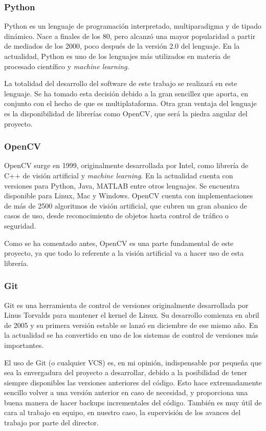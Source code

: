 \subsubsection*{Python}
Python es un lenguaje de programación interpretado, multiparadigma y de tipado dinámico. Nace a finales de los 80, pero alcanzó una mayor popularidad a partir de mediados de los 2000, poco después de la versión 2.0 del lenguaje. En la actualidad, Python es uno de los lenguajes más utilizados en materia de procesado científico y \textit{machine learning}.

La totalidad del desarrollo del software de este trabajo se realizará en este lenguaje. Se ha tomado esta decisión debido a la gran sencillez que aporta, en conjunto con el hecho de que es multiplataforma. Otra gran ventaja del lenguaje es la disponibilidad de librerías como OpenCV, que será la piedra angular del proyecto. 

\subsubsection*{OpenCV}
OpenCV surge en 1999, originalmente desarrollada por Intel, como librería de C++ de visión artificial y \textit{machine learning}. En la actualidad cuenta con versiones para Python, Java, MATLAB entre otros lenguajes. Se encuentra disponible para Linux, Mac y Windows. OpenCV cuenta con implementaciones de más de 2500 algoritmos de visión artificial, que cubren un gran abanico de casos de uso, desde reconocimiento de objetos hasta control de tráfico o seguridad.

Como se ha comentado antes, OpenCV es una parte fundamental de este proyecto, ya que todo lo referente a la visión artificial va a hacer uso de esta librería.

\subsubsection*{Git}
Git es una herramienta de control de versiones originalmente desarrollada por Linus Torvalds para mantener el kernel de Linux. Su desarrollo comienza en abril de 2005 y su primera versión estable se lanzó en diciembre de ese mismo año. En la actualidad se ha convertido en uno de los sistemas de control de versiones más importantes.

El uso de Git (o cualquier VCS) es, en mi opinión, indispensable por pequeña que sea la envergadura del proyecto a desarrollar, debido a la posibilidad de tener siempre disponibles las versiones anteriores del código. Esto hace extremadamente sencillo volver a una versión anterior en caso de necesidad, y proporciona una buena manera de hacer backups incrementales del código. También es muy útil de cara al trabajo en equipo, en nuestro caso, la supervisión de los avances del trabajo por parte del director.


